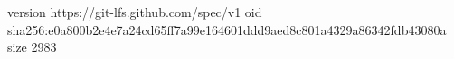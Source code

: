 version https://git-lfs.github.com/spec/v1
oid sha256:e0a800b2e4e7a24cd65ff7a99e164601ddd9aed8c801a4329a86342fdb43080a
size 2983
